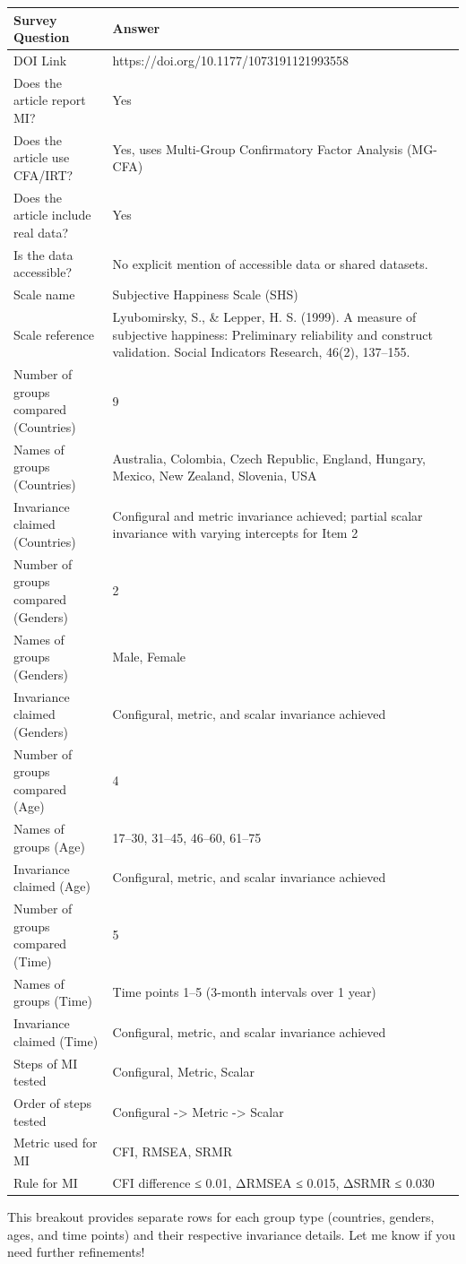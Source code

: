 \documentclass[
  man]{apa7}
\begin{document}
\begin{tabular}{l|l}
\hline
Survey Question & Answer\\
\hline
DOI Link & https://doi.org/10.1177/1073191121993558\\
\hline
Does the article report MI? & Yes\\
\hline
Does the article use CFA/IRT? & Yes, uses Multi-Group Confirmatory Factor Analysis (MG-CFA)\\
\hline
Does the article include real data? & Yes\\
\hline
Is the data accessible? & No explicit mention of accessible data or shared datasets.\\
\hline
Scale name & Subjective Happiness Scale (SHS)\\
\hline
Scale reference & Lyubomirsky, S., \& Lepper, H. S. (1999). A measure of subjective happiness: Preliminary reliability and construct validation. Social Indicators Research, 46(2), 137–155.\\
\hline
Number of groups compared (Countries) & 9\\
\hline
Names of groups (Countries) & Australia, Colombia, Czech Republic, England, Hungary, Mexico, New Zealand, Slovenia, USA\\
\hline
Invariance claimed (Countries) & Configural and metric invariance achieved; partial scalar invariance with varying intercepts for Item 2\\
\hline
Number of groups compared (Genders) & 2\\
\hline
Names of groups (Genders) & Male, Female\\
\hline
Invariance claimed (Genders) & Configural, metric, and scalar invariance achieved\\
\hline
Number of groups compared (Age) & 4\\
\hline
Names of groups (Age) & 17–30, 31–45, 46–60, 61–75\\
\hline
Invariance claimed (Age) & Configural, metric, and scalar invariance achieved\\
\hline
Number of groups compared (Time) & 5\\
\hline
Names of groups (Time) & Time points 1–5 (3-month intervals over 1 year)\\
\hline
Invariance claimed (Time) & Configural, metric, and scalar invariance achieved\\
\hline
Steps of MI tested & Configural, Metric, Scalar\\
\hline
Order of steps tested & Configural -> Metric -> Scalar\\
\hline
Metric used for MI & CFI, RMSEA, SRMR\\
\hline
Rule for MI & CFI difference ≤ 0.01, ΔRMSEA ≤ 0.015, ΔSRMR ≤ 0.030\\
\hline
\end{tabular}

This breakout provides separate rows for each group type (countries, genders, ages, and time points) and their respective invariance details. Let me know if you need further refinements!
\end{document}
